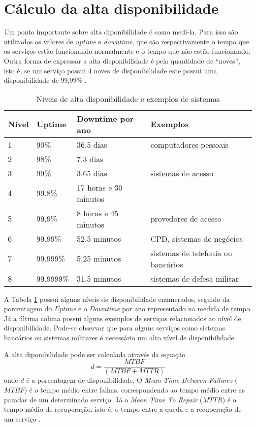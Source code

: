 \section{Cálculo da alta disponibilidade}

Um ponto importante sobre alta diponibilidade é como medi-la. Para isso são utilizados os valores de \textit{uptime} e 
\textit{downtime}, que são respectivamente o tempo que os serviços estão funcionando normalmente e o tempo que não estão funcionando.
Outra forma de expressar a alta disponibilidade é pela quantidade de ``noves'', isto é, se um serviço possui 4 noves de disponibilidade
este possui uma disponibilidade de 99,99\% \cite{pereirafilho2004}.

\begin{table}
\caption {Níveis de alta disponibilidade e exemplos de sistemas}
\label{tab:dispniveis}
\begin{center}
\begin{tabular}{|l|l|l|l|}\hline
Nível & Uptime & Downtime por ano & Exemplos\\\hline
1 & 90\% & 36.5 dias & computadores pessoais\\\hline
2 & 98\% & 7.3 dias & \\\hline
3 & 99\% & 3.65 dias & sistemas de acesso\\\hline
4 & 99.8\% & 17 horas e 30 minutos & \\\hline
5 & 99.9\% & 8 horas e 45 minutos & provedores de acesso\\\hline
6 & 99.99\% & 52.5 minutos & CPD, sistemas de negócios\\\hline
7 & 99.999\% & 5.25 minutos & sistemas de telefonia ou bancários\\\hline
8 & 99.9999\% & 31.5 minutos & sistemas de defesa militar\\\hline
\end{tabular}
\end{center}
\end{table}

A Tabela \ref{tab:dispniveis} possui alguns níveis de disponibilidade enumerados, seguido da porcentagem do \textit{Uptime} e 
o \textit{Downtime} por ano representado na medida de tempo.
Já a última coluna possui alguns exemplos de serviços relacionados ao nível de disponibilidade. 
Pode-se observar que para alguns serviços como sistemas bancários ou sistemas militares é necessário um alto nível de disponibilidade.

A alta diponibilidade pode ser calculada através da equação
\begin{equation}
d = \frac{MTBF}{(MTBF + MTTR)}
\label{diponibilidade}
\end{equation}
onde $d$ é a porcentagem de disponibilidade. O \textit{Mean Time Between Failures} ($MTBF$) é o tempo médio entre falhas, correspondendo ao 
tempo médio entre as paradas de um determinado serviço. Já o \textit{Mean Time To Repair} ($MTTR$) é o tempo médio de recuperação, isto é, 
o tempo entre a queda e a recuperação de um serviço \cite{goncalves2009}.

